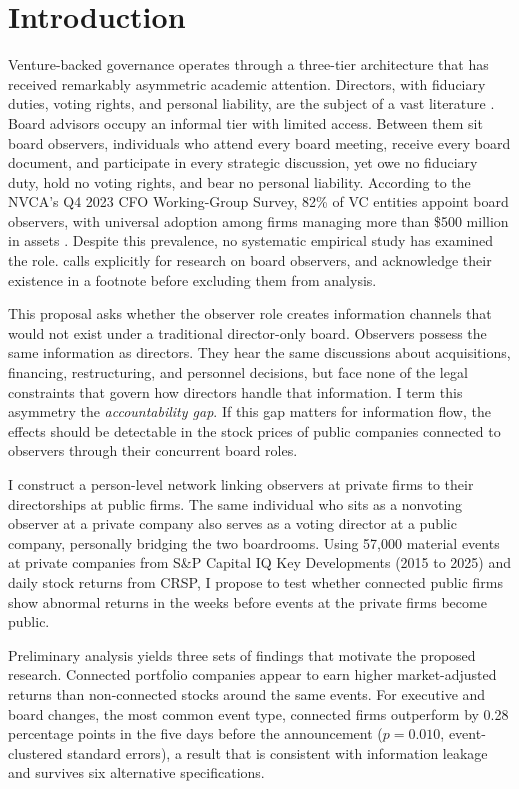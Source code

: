 \section{Introduction}
\label{sec:intro}

Venture-backed governance operates through a three-tier architecture that has received remarkably asymmetric academic attention. Directors, with fiduciary duties, voting rights, and personal liability, are the subject of a vast literature \cite{hermalin2003boards,adams2010role}. Board advisors occupy an informal tier with limited access. Between them sit board observers, individuals who attend every board meeting, receive every board document, and participate in every strategic discussion, yet owe no fiduciary duty, hold no voting rights, and bear no personal liability. According to the NVCA's Q4 2023 CFO Working-Group Survey, 82\% of VC entities appoint board observers, with universal adoption among firms managing more than \$500 million in assets \cite{packin2025board}. Despite this prevalence, no systematic empirical study has examined the role.  calls explicitly for research on board observers, and  acknowledge their existence in a footnote before excluding them from analysis.

This proposal asks whether the observer role creates information channels that would not exist under a traditional director-only board. Observers possess the same information as directors. They hear the same discussions about acquisitions, financing, restructuring, and personnel decisions, but face none of the legal constraints that govern how directors handle that information. I term this asymmetry the \textit{accountability gap}. If this gap matters for information flow, the effects should be detectable in the stock prices of public companies connected to observers through their concurrent board roles.

I construct a person-level network linking observers at private firms to their directorships at public firms. The same individual who sits as a nonvoting observer at a private company also serves as a voting director at a public company, personally bridging the two boardrooms. Using 57,000 material events at private companies from S\&P Capital IQ Key Developments (2015 to 2025) and daily stock returns from CRSP, I propose to test whether connected public firms show abnormal returns in the weeks before events at the private firms become public.

Preliminary analysis yields three sets of findings that motivate the proposed research. Connected portfolio companies appear to earn higher market-adjusted returns than non-connected stocks around the same events. For executive and board changes, the most common event type, connected firms outperform by 0.28 percentage points in the five days before the announcement ($p=0.010$, event-clustered standard errors), a result that is consistent with information leakage and survives six alternative specifications.

